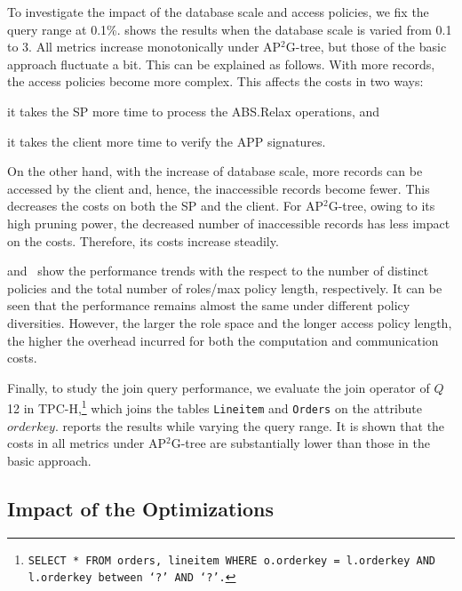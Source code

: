 To investigate the impact of the database scale and access policies, we fix the query range at 0.1\%.  shows the results when the database scale is varied from 0.1 to 3. All metrics increase monotonically under AP$^2$G-tree, but those of the basic approach fluctuate a bit. This can be explained as follows. With more records, the access policies become more complex. This affects the costs in two ways:
\begin{inlineenum}
    \item it takes the SP more time to process the \textsf{ABS.Relax} operations, and
    \item it takes the client more time to verify the APP signatures.
\end{inlineenum}
On the other hand, with the increase of database scale, more records can be accessed by the client and, hence, the inaccessible records become fewer. This decreases the costs on both the SP and the client.
For AP$^2$G-tree, owing to its high pruning power, the decreased number of inaccessible records has less impact on the costs. Therefore, its costs increase steadily.

 and~ show the performance trends with the respect to the number of distinct policies and the total number of roles/max policy length, respectively. It can be seen that the performance  remains almost the same under different policy diversities. However, the  larger the role space and the longer access policy length, the higher the overhead incurred for both the computation and communication costs.

Finally, to study the join query performance, we evaluate the join operator of $Q$12 in TPC-H,\footnote{\texttt{SELECT * FROM orders, lineitem WHERE o.orderkey = l.orderkey AND l.orderkey between `?' AND `?'.}} which joins the tables \texttt{Lineitem} and \texttt{Orders} on the attribute $orderkey$.  reports the results while varying the query range. It is shown that the costs in all metrics under AP$^2$G-tree are substantially lower than those in the basic approach.

\subsection{Impact of the Optimizations}

